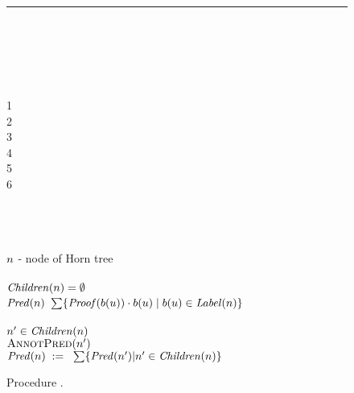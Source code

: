\linespread{1.2}
\begin{figure}[t]
\hrule
  \centering
  \begin{minipage}[t]{.04\columnwidth}
   \mbox{}
   \\ \\ \\ \\ \\ 
   1 \\ 2 \\ 3 \\ 4 \\ 5 \\ 6 %
  \end{minipage}
  \begin{minipage}[t]{.94\columnwidth}
    \mbox{}\\
    \algProcedure \algBuildPred\\
    \algInput \\
    \tabT $n$ - node of Horn tree\\
    \algBegin \\
    \tabT \algIf $\mathit{Children}(n) = \emptyset$ \algThen \\
    \tabTT $\mathit{Pred}(n)$ \algAssgn 
    $
    \sum\{\mathit{Proof}(b(u))\cdot b(u) \mid
      b(u)\in\mathit{Label}(n)\}
    $ \\
    \tabT \algElse \\
    \tabTT  \algForeach $n'\in\mathit{Children}(n)$ \algDo \\
    \tabTTT $\textsc{AnnotPred}(n')$\\
    \tabTT $\mathit{Pred}(n) \;:=\;\; \sum\{\mathit{Pred}(n')|n'\in\mathit{Children}(n)\}$ \\
    \algEnd
  \end{minipage}
  \vspace{1ex}
  \linespread{1}
  \caption{Procedure \algBuildPred.}
  \label{fig-alg-annotPred}
\end{figure}
